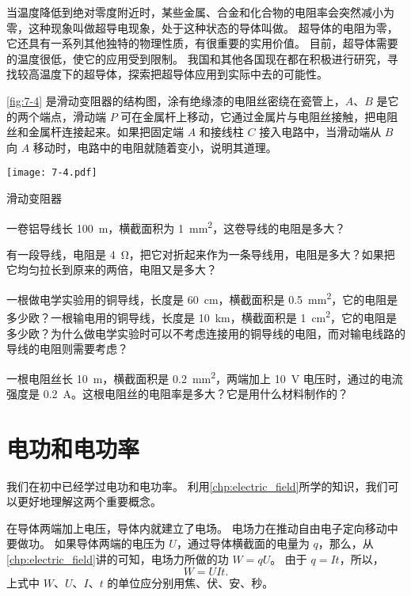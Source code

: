 当温度降低到绝对零度附近时，某些金属、合金和化合物的电阻率会突然减小为零，这种现象叫做超导电现象，处于这种状态的导体叫做。
超导体的电阻为零，它还具有一系列其他独特的物理性质，有很重要的实用价值。
目前，超导体需要的温度很低，使它的应用受到限制。
我国和其他各国现在都在积极进行研究，寻找较高温度下的超导体，探索把超导体应用到实际中去的可能性。

\begin{Practice}
\begin{question}
  \item \cref{fig:7-4} 是滑动变阻器的结构图，涂有绝缘漆的电阻丝密绕在瓷管上，$A$、$B$ 是它的两个端点，滑动端 $P$ 可在金属杆上移动，它通过金属片与电阻丝接触，把电阻丝和金属杆连接起来。如果把固定端 $A$ 和接线柱 $C$ 接入电路中，当滑动端从 $B$ 向 $A$ 移动时，电路中的电阻就随着变小，说明其道理。
  \begin{figurehere}
    \begin{minipage}{\linewidth}\centering
      \texttt{[image: 7-4.pdf]}
      \caption{滑动变阻器}\label{fig:7-4}
    \end{minipage}
  \end{figurehere}
  \item 一卷铝导线长 \qty{100}{m}，横截面积为 \qty{1}{mm^2}，这卷导线的电阻是多大？
  \item 有一段导线，电阻是 \qty{4}{\ohm}，把它对折起来作为一条导线用，电阻是多大？如果把它均匀拉长到原来的两倍，电阻又是多大？
  \item 一根做电学实验用的铜导线，长度是 \qty{60}{cm}，横截面积是 \qty{0.5}{mm^2}，它的电阻是多少欧？一根输电用的铜导线，长度是 \qty{10}{km}，横截面积是 \qty{1}{cm^2}，它的电阻是多少欧？为什么做电学实验时可以不考虑连接用的铜导线的电阻，而对输电线路的导线的电阻则需要考虑？
  \item 一根电阻丝长 \qty{10}{m}，横截面积是 \qty{0.2}{mm^2}，两端加上 \qty{10}{V} 电压时，通过的电流强度是 \qty{0.2}{A}。这根电阻丝的电阻率是多大？它是用什么材料制作的？
\end{question}
\end{Practice}

\section{电功和电功率}
我们在初中已经学过电功和电功率。
利用\cref{chp:electric_field}所学的知识，我们可以更好地理解这两个重要概念。

在导体两端加上电压，导体内就建立了电场。
电场力在推动自由电子定向移动中要做功。
如果导体两端的电压为 $U$，通过导体横截面的电量为 $q$，那么，从\cref{chp:electric_field}讲的可知，电场力所做的功 $W=qU$。
由于 $q=It$，所以，
\[W=UIt.\]
上式中 $W$、$U$、$I$、$t$ 的单位应分别用焦、伏、安、秒。


